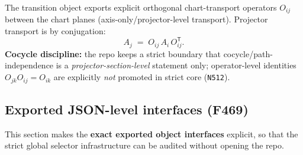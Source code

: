\documentclass[11pt,a4paper]{article}
\begin{document}
The transition object exports explicit orthogonal chart-transport operators $O_{ij}$ between the chart planes (axis-only/projector-level transport).
Projector transport is by conjugation:
\[
A_j \;=\; O_{ij}\,A_i\,O_{ij}^{\mathsf T}.
\]
\textbf{Cocycle discipline:} the repo keeps a strict boundary that cocycle/path-independence is a \emph{projector-section-level} statement only;
operator-level identities $O_{jk}O_{ij}=O_{ik}$ are explicitly \emph{not} promoted in strict core (\texttt{N512}).

\subsection{Exported JSON-level interfaces (F469)}
\label{sec:f469_interfaces}

This section makes the \textbf{exact exported object interfaces} explicit, so that the strict global selector infrastructure can be audited without opening the repo.
\end{document}
